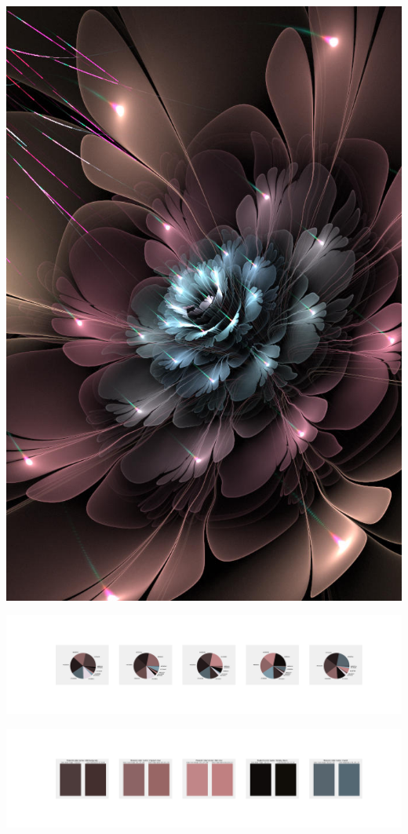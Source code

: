 \documentclass[11pt]{article}
\begin{document}
\begin{landscape}
    \begin{center}
    \includegraphics[width=\textwidth]{./nbimg/file (41).jpg}
    \end{center}

    \begin{center}
    \includegraphics[width=250mm]{./nbimg/pie-345.jpg}
    \end{center}

    \begin{center}
    \includegraphics[width=250mm]{./nbimg/peak-345.jpg}
    \end{center}
    


\end{landscape}
\end{document}

